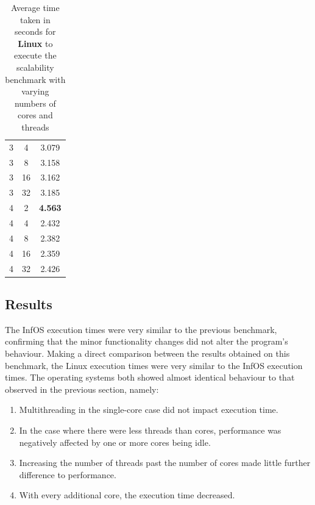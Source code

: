 \documentclass[bsc,frontabs,singlespacing,parskip,deptreport]{infthesis}
\begin{document}
\begin{table}[h]
{\begin{tabular}{ccc}
3 &4 &3.079 \\
3 &8 &3.158 \\
3 &16 &3.162 \\
3 &32 &3.185 \\
\midrule
4 &2 &\textbf{4.563} \\
4 &4 &2.432 \\
4 &8 &2.382 \\
4 &16 &2.359 \\
4 &32 &2.426 \\
\bottomrule
\end{tabular}
\caption{Average time taken in seconds for \textbf{Linux} to execute the scalability benchmark with varying numbers of cores and threads}\label{timing-scalability-linux}
}
\end{table}

\subsection{Results}

The InfOS execution times were very similar to the previous benchmark, confirming that the minor functionality changes did not alter the program's behaviour. Making a direct comparison between the results obtained on this benchmark, the Linux execution times were very similar to the InfOS execution times. The operating systems both showed almost identical behaviour to that observed in the previous section, namely:

\begin{enumerate}
    \item Multithreading in the single-core case did not impact execution time.
    \item In the case where there were less threads than cores, performance was negatively affected by one or more cores being idle.
    \item Increasing the number of threads past the number of cores made little further difference to performance.
    \item With every additional core, the execution time decreased.
\end{enumerate}
\end{document}
